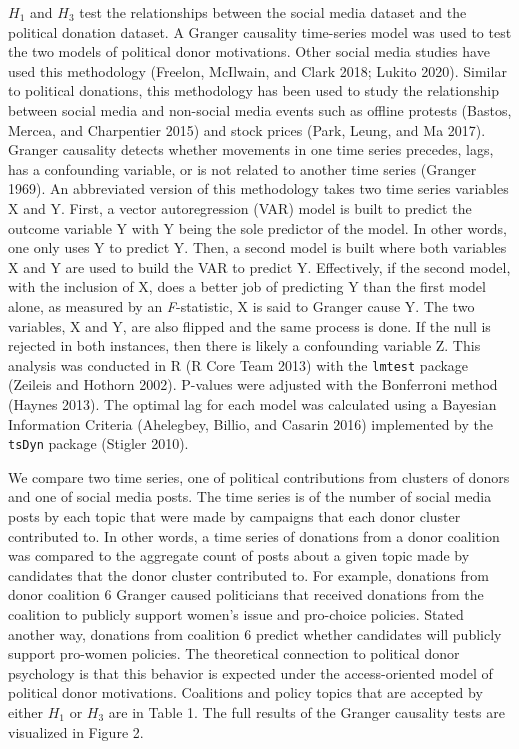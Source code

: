\documentclass[12pt,]{article}
\begin{document}
\(H_{1}\) and \(H_{3}\) test the relationships between the social media
dataset and the political donation dataset. A Granger causality
time-series model was used to test the two models of political donor
motivations. Other social media studies have used this methodology
(Freelon, McIlwain, and Clark 2018; Lukito 2020). Similar to political
donations, this methodology has been used to study the relationship
between social media and non-social media events such as offline
protests (Bastos, Mercea, and Charpentier 2015) and stock prices (Park,
Leung, and Ma 2017). Granger causality detects whether movements in one
time series precedes, lags, has a confounding variable, or is not
related to another time series (Granger 1969). An abbreviated version of
this methodology takes two time series variables X and Y. First, a
vector autoregression (VAR) model is built to predict the outcome
variable Y with Y being the sole predictor of the model. In other words,
one only uses Y to predict Y. Then, a second model is built where both
variables X and Y are used to build the VAR to predict Y. Effectively,
if the second model, with the inclusion of X, does a better job of
predicting Y than the first model alone, as measured by an
\emph{F}-statistic, X is said to Granger cause Y. The two variables, X
and Y, are also flipped and the same process is done. If the null is
rejected in both instances, then there is likely a confounding variable
Z. This analysis was conducted in R (R Core Team 2013) with the
\texttt{lmtest} package (Zeileis and Hothorn 2002). P-values were
adjusted with the Bonferroni method (Haynes 2013). The optimal lag for
each model was calculated using a Bayesian Information Criteria
(Ahelegbey, Billio, and Casarin 2016) implemented by the \texttt{tsDyn}
package (Stigler 2010).

We compare two time series, one of political contributions from clusters
of donors and one of social media posts. The time series is of the
number of social media posts by each topic that were made by campaigns
that each donor cluster contributed to. In other words, a time series of
donations from a donor coalition was compared to the aggregate count of
posts about a given topic made by candidates that the donor cluster
contributed to. For example, donations from donor coalition 6 Granger
caused politicians that received donations from the coalition to
publicly support women's issue and pro-choice policies. Stated another
way, donations from coalition 6 predict whether candidates will publicly
support pro-women policies. The theoretical connection to political
donor psychology is that this behavior is expected under the
access-oriented model of political donor motivations. Coalitions and
policy topics that are accepted by either \(H_{1}\) or \(H_{3}\) are in
Table 1. The full results of the Granger causality tests are visualized
in Figure 2.
\end{document}

